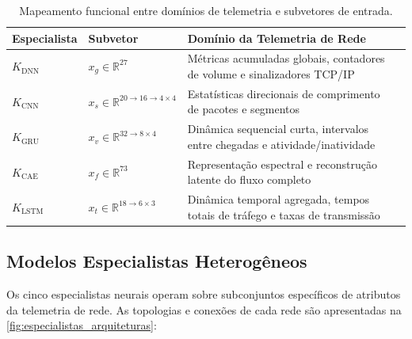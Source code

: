 \begin{table}[htb]
\centering
\caption{Mapeamento funcional entre domínios de telemetria e subvetores de entrada.}
\label{tab:especialistas_dominios}
\small
\begin{tabularx}{\textwidth}{lp{2.5cm}>{\raggedright\arraybackslash}X>{\raggedright\arraybackslash}p{4.2cm}}
\hline
\textbf{Especialista} & \textbf{Subvetor} & \textbf{Domínio da Telemetria de Rede} \\
\hline
\vspace{2mm}
$K_{\mathrm{DNN}}$ & $x_g \in \mathbb{R}^{27}$ & Métricas acumuladas globais, contadores de volume e
sinalizadores TCP/IP \\
\vspace{2mm}
$K_{\mathrm{CNN}}$ & $x_s \in \mathbb{R}^{20 \to 16 \to 4 \times 4}$ & Estatísticas direcionais de comprimento de
pacotes e segmentos \\
\vspace{2mm}
$K_{\mathrm{GRU}}$ & $x_v \in \mathbb{R}^{32 \to 8 \times 4}$ & Dinâmica sequencial curta, intervalos entre chegadas e
atividade/inatividade \\
\vspace{2mm}
$K_{\mathrm{CAE}}$ & $x_f \in \mathbb{R}^{73}$ & Representação espectral e reconstrução latente do fluxo completo \\
\vspace{2mm}
$K_{\mathrm{LSTM}}$ & $x_t \in \mathbb{R}^{18 \to 6 \times 3}$ & Dinâmica temporal agregada, tempos totais de tráfego e
taxas de transmissão \\
\hline
\end{tabularx}
\end{table}


\subsection{Modelos Especialistas Heterogêneos}
\label{subsec:especialistas}

Os cinco especialistas neurais operam sobre subconjuntos específicos de atributos da telemetria de rede. As topologias
e conexões de cada rede são apresentadas na \ref{fig:especialistas_arquiteturas}:

